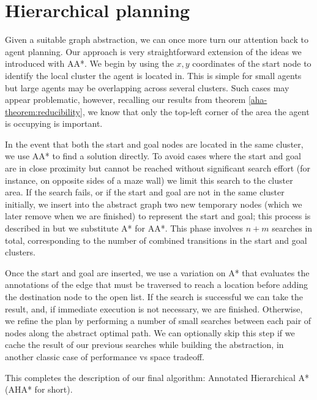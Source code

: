 \section{Hierarchical planning}
Given a suitable graph abstraction, we can once more turn our attention back to agent planning. Our approach is very straightforward extension of the ideas we introduced with AA*. 
We begin by using the $x,y$ coordinates of the start node to identify the local cluster the agent is located in. This is simple for small agents but large agents may be overlapping across several clusters. Such cases may appear problematic, however, recalling our results from theorem \ref{aha-theorem:reducibility}, we know that only the top-left corner of the area the agent is occupying is important.
\par \indent
In the event that both the start and goal nodes are located in the same cluster, we use AA* to find a solution directly. To avoid cases where the start and goal are in close proximity but cannot be reached without significant search effort (for instance, on opposite sides of a maze wall) we limit this search to the cluster area. If the search fails, or if the start and goal are not in the same cluster initially, we insert into the abstract graph two new temporary nodes (which we later remove when we are finished) to represent the start and goal; this process is described in \cite{botea04} but we substitute A* for AA*. This phase involves $n+m$ searches in total, corresponding to the number of combined transitions in the start and goal clusters.
\par \indent
Once the start and goal are inserted, we use a variation on A* that evaluates the annotations of the edge that must be traversed to reach a location before adding the destination node to the open list.
If the search is successful we can take the result, and, if immediate execution is not necessary, we are finished. Otherwise, we refine the plan by performing a number of small searches between each pair of nodes along the abstract optimal path. We can optionally skip this step if we cache the result of our previous searches while building the abstraction, in another classic case of performance vs space tradeoff. 
\par \indent
This completes the description of our final algorithm: Annotated Hierarchical A* (AHA* for short).
